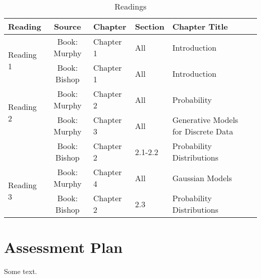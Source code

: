 \documentclass[12pt]{article}
\begin{document}
    \begin{table}
    \caption{Readings}
    \label{table:readings}
    \begin{center}
        \begin{tabular}{| l | c | l | l | l | l |}
            \hline
            Reading & Source & Chapter & Section & Chapter Title \\
            \hline
            \multirow{2}{*}{Reading 1} & Book: Murphy & Chapter 1 & All & Introduction \\
                                       & Book: Bishop & Chapter 1 & All & Introduction \\
            \hline
            \multirow{2}{*}{Reading 2} & Book: Murphy & Chapter 2 & All & Probability \\
                                       & Book: Murphy & Chapter 3 & All & Generative Models for Discrete Data \\
                                       & Book: Bishop & Chapter 2 & 2.1-2.2 & Probability Distributions \\
            \hline
            \multirow{2}{*}{Reading 3} & Book: Murphy & Chapter 4 & All & Gaussian Models \\
                                       & Book: Bishop & Chapter 2 & 2.3 & Probability Distributions \\
            \hline
        \end{tabular}
    \end{center}
    \end{table}

\section{Assessment Plan}

Some text.
\end{document}
